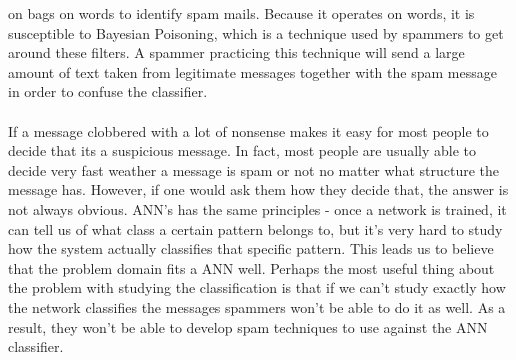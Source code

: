 on bags on words to identify spam mails. Because it operates on words, it is
susceptible to Bayesian Poisoning, which is a technique used by spammers to get
around these filters. A spammer practicing this technique will send a large
amount of text taken from legitimate messages together with the spam message in
order to confuse the classifier.  \\\\ If a message clobbered with a lot of
nonsense makes it easy for most people to decide that its a suspicious message.
In fact, most people are usually able to decide very fast weather a message is
spam or not no matter what structure the message has. However, if one would ask
them how they decide that, the answer is not always obvious.  ANN's has the
same principles - once a network is trained, it can tell us of what class a
certain pattern belongs to, but it's very hard to study how the system actually
classifies that specific pattern. This leads us to believe that the problem
domain fits a ANN well. Perhaps the most useful thing about the problem with studying the classification is
that if we can't study exactly how the network classifies the messages
spammers won't be able to do it as well. As a result, they won't be able to develop spam
techniques to use against the ANN classifier.
